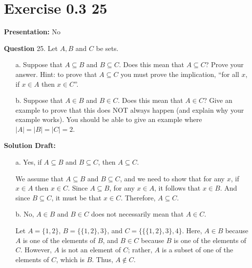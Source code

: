 \documentclass{article}
\begin{document}
\section*{Exercise 0.3 25}  

\noindent\textbf{Presentation:} No

\vspace{0.5cm} %

\noindent\textbf{Question}
25. Let \( A, B \) and \( C \) be sets.

\begin{enumerate}
    \item[a.] Suppose that \( A \subseteq B \) and \( B \subseteq C \). Does this mean that \( A \subseteq C \)? Prove your answer. Hint: to prove that \( A \subseteq C \) you must prove the implication, ``for all \( x \), if \( x \in A \) then \( x \in C \)''.

    \item[b.] Suppose that \( A \in B \) and \( B \in C \). Does this mean that \( A \in C \)? Give an example to prove that this does NOT always happen (and explain why your example works). You should be able to give an example where \( |A| = |B| = |C| = 2 \).
\end{enumerate}

\noindent\textbf{Solution Draft:} 
\begin{enumerate}
\item[a.] Yes, if \( A \subseteq B \) and \( B \subseteq C \), then \( A \subseteq C \). 

We assume that \( A \subseteq B \) and \( B \subseteq C \), and we need to show that for any \( x \), if \( x \in A \) then \( x \in C \). Since \( A \subseteq B \), for any \( x \in A \), it follows that \( x \in B \). And since \( B \subseteq C \), it must be that \( x \in C \). Therefore, \( A \subseteq C \).

\item[b.] No, \( A \in B \) and \( B \in C \) does not necessarily mean that \( A \in C \). 

Let \( A = \{1, 2\} \), \( B = \{\{1, 2\}, 3\} \), and \( C = \{\{\{1, 2\}, 3\}, 4\} \). Here, \( A \in B \) because \( A \) is one of the elements of \( B \), and \( B \in C \) because \( B \) is one of the elements of \( C \). However, \( A \) is not an element of \( C \); rather, \( A \) is a subset of one of the elements of \( C \), which is \( B \). Thus, \( A \notin C \).
\end{enumerate}
\end{document}
